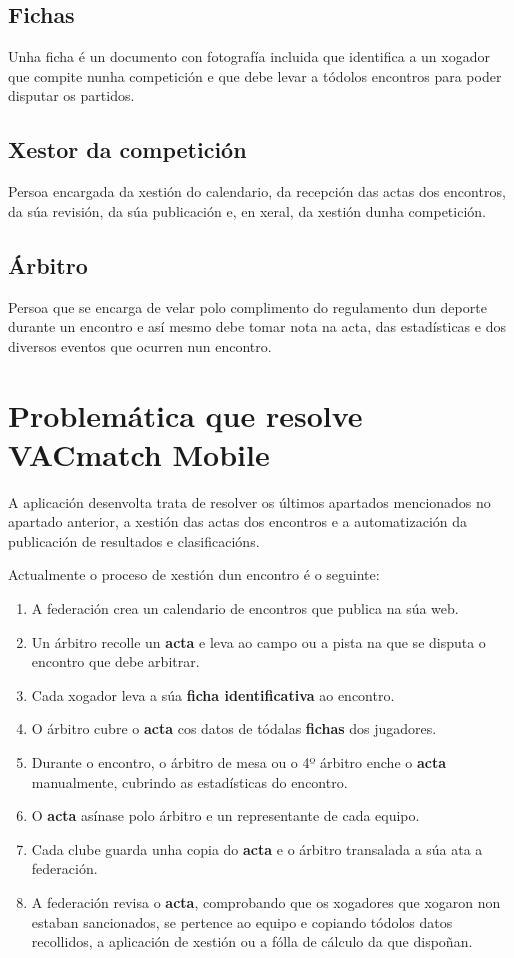       \subsection{Fichas}
    Unha ficha é un documento con fotografía incluida que identifica a un xogador que 
compite nunha competición e que debe levar a tódolos encontros para poder disputar os 
partidos.

      \subsection{Xestor da competición}
      Persoa encargada da xestión do calendario, da recepción das actas dos encontros, da 
súa revisión, da súa publicación e, en xeral, da xestión dunha competición.
    
      \subsection{Árbitro}
      Persoa que se encarga de velar polo complimento do regulamento dun deporte durante 
un encontro e así mesmo debe tomar nota na acta, das estadísticas e dos diversos eventos 
que ocurren nun encontro.

    \section{Problemática que resolve VACmatch Mobile}
    A aplicación desenvolta trata de resolver os últimos apartados mencionados no 
apartado anterior, a xestión das actas dos encontros e a automatización da publicación de 
resultados e clasificacións.

    Actualmente o proceso de xestión dun encontro é o seguinte:

    \begin{enumerate}
     \item A federación crea un calendario de encontros que publica na súa web.
     \item Un árbitro recolle un \textbf{acta} e leva ao campo ou a pista na que se 
disputa o encontro que debe arbitrar.
     \item Cada xogador leva a súa \textbf{ficha identificativa} ao encontro.
     \item O árbitro cubre o \textbf{acta} cos datos de tódalas \textbf{fichas} 
dos jugadores.
     \item Durante o encontro, o árbitro de mesa ou o 4º árbitro enche o \textbf{acta} 
manualmente, cubrindo as estadísticas do encontro.
     \item O \textbf{acta} asínase polo árbitro e un representante de cada equipo.
     \item Cada clube guarda unha copia do \textbf{acta} e o árbitro transalada a súa ata 
a federación.
     \item A federación revisa o \textbf{acta}, comprobando que os xogadores que xogaron 
non estaban sancionados, se pertence ao equipo e copiando tódolos datos recollidos, a 
aplicación de xestión ou a fólla de cálculo da que dispoñan.
    \end{enumerate}
  
